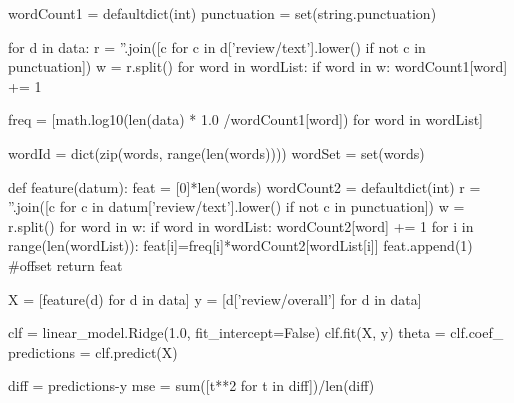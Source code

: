\documentclass{assignment}
\begin{document}
\begin{problemlist}
\begin{python}
wordCount1 = defaultdict(int)
punctuation = set(string.punctuation)

for d in data:
  r = ''.join([c for c in d['review/text'].lower() if not c in punctuation])
  w = r.split()
  for word in wordList:
    if word in w:
      wordCount1[word] += 1

freq = [math.log10(len(data) * 1.0 /wordCount1[word]) for word in wordList]

wordId = dict(zip(words, range(len(words))))
wordSet = set(words)

def feature(datum):
  feat = [0]*len(words)
  wordCount2 = defaultdict(int)
  r = ''.join([c for c in datum['review/text'].lower() if not c in punctuation])
  w = r.split()
  for word in w:
    if word in wordList:
      wordCount2[word] += 1
  for i in range(len(wordList)):
    feat[i]=freq[i]*wordCount2[wordList[i]]
  feat.append(1) #offset
  return feat

X = [feature(d) for d in data]
y = [d['review/overall'] for d in data]

clf = linear_model.Ridge(1.0, fit_intercept=False)
clf.fit(X, y)
theta = clf.coef_
predictions = clf.predict(X)

diff = predictions-y
mse = sum([t**2 for t in diff])/len(diff)
\end{python}


\end{problemlist}
\end{document}
